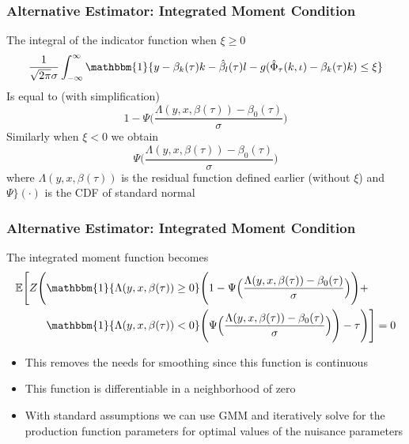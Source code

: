 \documentclass{beamer}
\begin{document}
\begin{frame}
\frametitle{Alternative Estimator: Integrated Moment Condition}
The integral of the indicator function when $\xi\geq 0$
\begin{equation}
	\frac{1}{\sqrt{2\pi}\sigma}\int_{-\infty}^{\infty}\mathbbm{1}\{y-\beta_{k}(\tau)k-\hat{\beta}_{l}(\tau)l-g(\hat{\Phi}_{\tau}(k, \iota)-\beta_{k}(\tau)k)\leq \xi\}
\end{equation}
Is equal to (with simplification)
\begin{equation}
	1-\Psi\Big(\frac{\Lambda(y, x, \beta(\tau))-\beta_{0}(\tau)}{\sigma}\Big)
\end{equation}
Similarly when $\xi<0$ we obtain
\begin{equation}
	\Psi\Big(\frac{\Lambda(y, x, \beta(\tau))-\beta_{0}(\tau)}{\sigma}\Big)
\end{equation}
where $\Lambda(y, x, \beta(\tau))$ is the residual function defined earlier (without $\xi$) and $\Psi\}(\cdot)$ is the CDF of standard normal
\end{frame}


\begin{frame}
\frametitle{Alternative Estimator: Integrated Moment Condition}
The integrated moment function becomes
\begin{equation}
\begin{split}
	\mathbb{E}\Bigg[Z\Bigg(&\mathbbm{1}\{\Lambda(y, x, \beta(\tau))\geq0\}\Bigg(1-\Psi\Big(\frac{\Lambda(y, x, \beta(\tau))-\beta_{0}(\tau)}{\sigma}\Big)\Bigg)+
	\\&\mathbbm{1}\{\Lambda(y, x, \beta(\tau))<0\}\Bigg(\Psi\Big(\frac{\Lambda(y, x, \beta(\tau))-\beta_{0}(\tau)}{\sigma}\Big)\Bigg)-\tau\Bigg)\Bigg]=0
	\end{split}
\end{equation}
\begin{itemize}
	\item This removes the needs for smoothing since this function is continuous
	\item This function is differentiable in a neighborhood of zero
	\item With standard assumptions we can use GMM and iteratively solve for the production function parameters for optimal values of the nuisance parameters
\end{itemize}
\end{frame}
\end{document}
